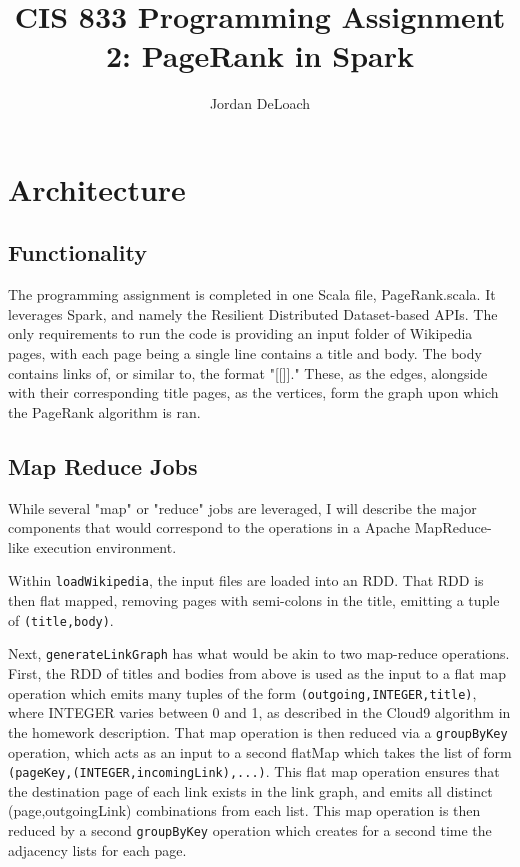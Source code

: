 \documentclass{article}
\begin{document}
\title{CIS 833 Programming Assignment 2: PageRank in Spark}
\author{Jordan DeLoach}

\maketitle
\large

\section{Architecture}
\subsection{Functionality}
The programming assignment is completed in one Scala file, PageRank.scala.
It leverages Spark, and namely the Resilient Distributed Dataset-based APIs.
The only requirements to run the code is providing an input folder of Wikipedia pages, with each page being a single line contains a title and body.
The body contains links of, or similar to, the format "[[]]."
These, as the edges, alongside with their corresponding title pages, as the vertices, form the graph upon which the PageRank algorithm is ran.

\subsection{Map Reduce Jobs}
While several "map" or "reduce" jobs are leveraged, I will describe the major components that would correspond to the operations in a Apache MapReduce-like execution environment.

Within \texttt{loadWikipedia}, the input files are loaded into an RDD.
That RDD is then flat mapped, removing pages with semi-colons in the title, emitting a tuple of \texttt{(title,body)}.

Next, \texttt{generateLinkGraph} has what would be akin to two map-reduce operations.
First, the RDD of titles and bodies from above is used as the input to a flat map operation which emits many tuples of the form \texttt{(outgoing,INTEGER,title)}, where INTEGER varies between 0 and 1, as described in the Cloud9 algorithm in the homework description.
That map operation is then reduced via a \texttt{groupByKey} operation, which acts as an input to a second flatMap which takes the list of form \texttt{(pageKey,{(INTEGER,incomingLink),...})}.
This flat map operation ensures that the destination page of each link exists in the link graph, and emits all distinct (page,outgoingLink) combinations from each list.
This map operation is then reduced by a second \texttt{groupByKey} operation which creates for a second time the adjacency lists for each page.
\end{document}

